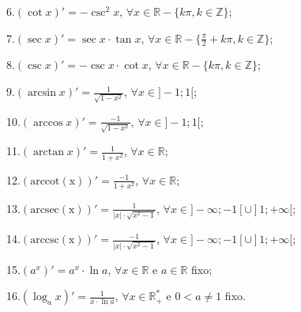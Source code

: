\documentclass{article}
\begin{document}
{\begin{newpage}
6.$(\cot{x})'=-\csc^{2}{x}$, $\forall x\in\mathbb{R}-\{{k\pi, k\in\mathbb{Z}}\}$;
\par
\vspace{0.3cm}
7.$(\sec{x})'=\sec{x}\cdot\tan{x}$, $\forall x\in\mathbb{R}-\Big\{\displaystyle{\frac{\pi }{2}} + k\pi, k\in\mathbb{Z}\Big\}$;
\par
\vspace{0.3cm}
8.$(\csc{x})'=-\csc{x}\cdot\cot{x}$, $\forall x\in\mathbb{R}-\{{k\pi, k\in\mathbb{Z}}\}$;
\par
\vspace{0.3cm}
9.$(\arcsin{x})'=\displaystyle{\displaystyle{\frac{1}{\sqrt{1-x^2}}}}$, $\forall x\in ]-1;1[$;
\par
\vspace{0.3cm}
10.$(\arccos{x})'=\displaystyle{\displaystyle{\frac{-1}{\sqrt{1-x^2}}}}$, $\forall x\in ]-1;1[$;
\par
\vspace{0.3cm}
11.$(\arctan{x})'=\displaystyle{\displaystyle{\frac{1}{1+x^2}}}$, $\forall x\in\mathbb{R}$;
\par
\vspace{0.3cm}
12.$(\operatorname{arccot(x)})'= \displaystyle{\displaystyle{\frac{-1}{1+x^2}}}$, $\forall x\in\mathbb{R}$;
\par
\vspace{0.3cm}
13.$(\operatorname{arcsec(x)})'= \displaystyle{\frac{1}{|x|\cdot\sqrt{x^2 - 1}}}$, $\forall x\in ]-\infty ;-1[ \cup ]1;+\infty[$;
\par
\vspace{0.3cm}
14.$(\operatorname{arccsc(x)})'= \displaystyle{\frac{-1}{|x|\cdot\sqrt{x^2 - 1}}}$, $\forall x\in ]-\infty ;-1[ \cup ]1;+\infty[$;
\par
\vspace{0.3cm}
15.$(a^x)'= a^{x}\cdot\ln{a}$, $\forall x\in\mathbb{R}$ e $a\in\mathbb{R}$ fixo;
\par
\vspace{0.3cm}
16.$(\log_{a}{x})'=\displaystyle{\frac{1}{x\cdot\ln{a}}}$, $\forall x\in\mathbb{R^{*}_{+}}$ e $0<a\neq1$ fixo.
\par
\vspace{0.3cm}

\end{newpage}}
\end{document}
